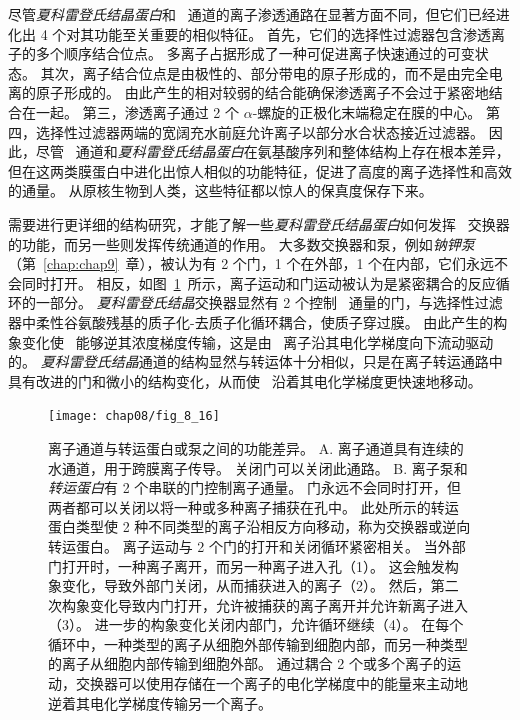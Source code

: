 尽管\textit{夏科雷登氏结晶蛋白}和~ 通道的离子渗透通路在显著方面不同，但它们已经进化出 4 个对其功能至关重要的相似特征。
首先，它们的选择性过滤器包含渗透离子的多个顺序结合位点。
多离子占据形成了一种可促进离子快速通过的可变状态。
其次，离子结合位点是由极性的、部分带电的原子形成的，而不是由完全电离的原子形成的。
由此产生的相对较弱的结合能确保渗透离子不会过于紧密地结合在一起。
第三，渗透离子通过 2 个 $\alpha$-螺旋的正极化末端稳定在膜的中心。
第四，选择性过滤器两端的宽阔充水前庭允许离子以部分水合状态接近过滤器。
因此，尽管~ 通道和\textit{夏科雷登氏结晶蛋白}在氨基酸序列和整体结构上存在根本差异，但在这两类膜蛋白中进化出惊人相似的功能特征，促进了高度的离子选择性和高效的通量。 
从原核生物到人类，这些特征都以惊人的保真度保存下来。


需要进行更详细的结构研究，才能了解一些\textit{夏科雷登氏结晶蛋白}如何发挥~ 交换器的功能，而另一些则发挥传统通道的作用。
大多数交换器和泵，例如\textit{钠钾泵}（第~\ref{chap:chap9}~章），被认为有 2 个门，1 个在外部，1 个在内部，它们永远不会同时打开。
相反，如图~\ref{fig:8_16}~所示，离子运动和门运动被认为是紧密耦合的反应循环的一部分。
\textit{夏科雷登氏结晶}交换器显然有 2 个控制~ 通量的门，与选择性过滤器中柔性谷氨酸残基的质子化-去质子化循环耦合，使质子穿过膜。
由此产生的构象变化使~ 能够逆其浓度梯度传输，这是由~ 离子沿其电化学梯度向下流动驱动的。
\textit{夏科雷登氏结晶}通道的结构显然与转运体十分相似，只是在离子转运通路中具有改进的门和微小的结构变化，从而使~ 沿着其电化学梯度更快速地移动。


\begin{figure}[htbp]
	\centering
	\texttt{[image: chap08/fig\_8\_16]}
	\caption{离子通道与转运蛋白或泵之间的功能差异\cite{gadsby2004spot}。 
		A. 离子通道具有连续的水通道，用于跨膜离子传导。
		关闭门可以关闭此通路。
		B. 离子泵和\textit{转运蛋白}有 2 个串联的门控制离子通量。
		门永远不会同时打开，但两者都可以关闭以将一种或多种离子捕获在孔中。
		此处所示的转运蛋白类型使 2 种不同类型的离子沿相反方向移动，称为交换器或逆向转运蛋白。
		离子运动与 2 个门的打开和关闭循环紧密相关。
		当外部门打开时，一种离子离开，而另一种离子进入孔（1）。
		这会触发构象变化，导致外部门关闭，从而捕获进入的离子（2）。
		然后，第二次构象变化导致内门打开，允许被捕获的离子离开并允许新离子进入（3）。
		进一步的构象变化关闭内部门，允许循环继续（4）。
		在每个循环中，一种类型的离子从细胞外部传输到细胞内部，而另一种类型的离子从细胞内部传输到细胞外部。
		通过耦合 2 个或多个离子的运动，交换器可以使用存储在一个离子的电化学梯度中的能量来主动地逆着其电化学梯度传输另一个离子。}
	\label{fig:8_16}
\end{figure}



